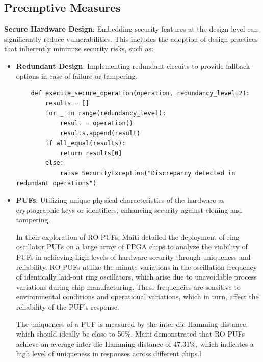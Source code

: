 \hypertarget{preemptive-measures}{%
\subsection{Preemptive Measures}\label{preemptive-measures}}

\textbf{Secure Hardware Design}: Embedding security features at the
design level can significantly reduce vulnerabilities. This includes the
adoption of design practices that inherently minimize security risks,
such as:

\begin{itemize}
\item
  \textbf{Redundant Design}: Implementing redundant circuits to provide
  fallback options in case of failure or tampering.

  \begin{verbatim}
    def execute_secure_operation(operation, redundancy_level=2):
        results = []
        for _ in range(redundancy_level):
            result = operation()
            results.append(result)
        if all_equal(results):
            return results[0] 
        else:
            raise SecurityException("Discrepancy detected in redundant operations")
    \end{verbatim}
    
\item
  \textbf{PUFs}: Utilizing unique
  physical characteristics of the hardware as cryptographic keys or
  identifiers, enhancing security against cloning and tampering.

  In their exploration of RO-PUFs\cite{maitiLargeScaleCharacterization2010}, Maiti detailed the deployment of ring oscillator PUFs on a large array of FPGA chips to analyze the viability of PUFs in achieving high levels of hardware security through uniqueness and reliability. RO-PUFs utilize the minute variations in the oscillation frequency of identically laid-out ring oscillators, which arise due to unavoidable process variations during chip manufacturing. These frequencies are sensitive to environmental conditions and operational variations, which in turn, affect the reliability of the PUF's response.

  The uniqueness of a PUF is measured by the inter-die Hamming distance, which should ideally be close to 50\%. Maiti demonstrated that RO-PUFs achieve an average inter-die Hamming distance of 47.31\%, which indicates a high level of uniqueness in responses across different chips.l
\end{itemize}

